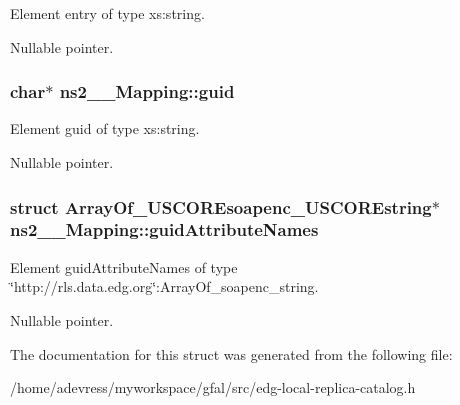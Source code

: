 Element entry of type xs:string. 

Nullable pointer. 
\subsubsection{\setlength{\rightskip}{0pt plus 5cm}char$\ast$ \bf{ns2\_\-\_\-Mapping::guid}}\label{structns2____Mapping_b23babab55f61e9f3dd9154a1ce88e49}


Element guid of type xs:string. 

Nullable pointer. 
\subsubsection{\setlength{\rightskip}{0pt plus 5cm}struct \bf{Array\-Of\_\-USCOREsoapenc\_\-USCOREstring}$\ast$ \bf{ns2\_\-\_\-Mapping::guid\-Attribute\-Names}}\label{structns2____Mapping_c53c70829394dd85f68cff7c4f111b42}


Element guid\-Attribute\-Names of type \char`\"{}http://rls.data.edg.org\char`\"{}:Array\-Of\_\-soapenc\_\-string. 

Nullable pointer. 

The documentation for this struct was generated from the following file:\begin{CompactItemize}
\item 
/home/adevress/myworkspace/gfal/src/edg-local-replica-catalog.h\end{CompactItemize}
